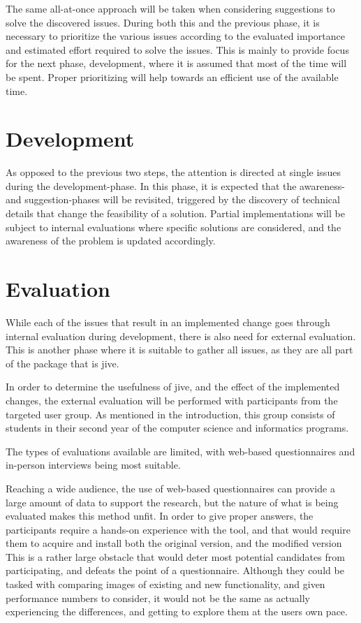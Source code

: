 The same all-at-once approach will be taken when considering suggestions to solve the discovered issues.
During both this and the previous phase, it is necessary to prioritize the various issues according to the evaluated importance and estimated effort required to solve the issues.
This is mainly to provide focus for the next phase, development, where it is assumed that most of the time will be spent.
Proper prioritizing will help towards an efficient use of the available time. 

\section{Development}\label{methDevelop}

As opposed to the previous two steps, the attention is directed at single issues during the development-phase.
In this phase, it is expected that the awareness- and suggestion-phases will be revisited, triggered by the discovery of technical details that change the feasibility of a solution.
Partial implementations will be subject to internal evaluations where specific solutions are considered, and the awareness of the problem is updated accordingly.

\section{Evaluation}\label{methEval}

While each of the issues that result in an implemented change goes through internal evaluation during development, there is also need for external evaluation.
This is another phase where it is suitable to gather all issues, as they are all part of the package that is \gls{jive}.

In order to determine the usefulness of \gls{jive}, and the effect of the implemented changes, the external evaluation will be performed with participants from the targeted user group.
As mentioned in the introduction, this group consists of students in their second year of the computer science and informatics programs.

The types of evaluations available are limited, with web-based questionnaires and in-person interviews being most suitable.

Reaching a wide audience, the use of web-based questionnaires can provide a large amount of data to support the research, but the nature of what is being evaluated makes this method unfit.
In order to give proper answers, the participants require a hands-on experience with the tool, and that would require them to acquire and install both the original version, and the modified version
This is a rather large obstacle that would deter most potential candidates from participating, and defeats the point of a questionnaire.
Although they could be tasked with comparing images of existing and new functionality, and given performance numbers to consider, it would not be the same as actually experiencing the differences, and getting to explore them at the users own pace.

